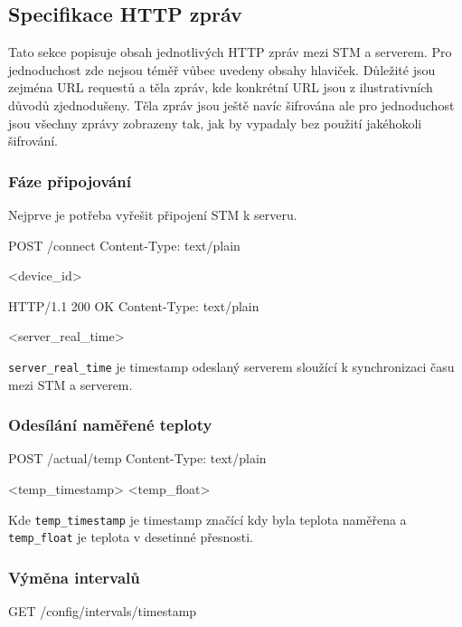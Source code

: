 \subsection{Specifikace HTTP zpráv} \label{kap:specifikace-http-zprav}

Tato sekce popisuje obsah jednotlivých HTTP zpráv mezi STM a serverem.
Pro jednoduchost zde nejsou téměř vůbec uvedeny obsahy hlaviček.
Důležité jsou zejména URL requestů a těla zpráv, kde konkrétní URL jsou z ilustrativních důvodů
zjednodušeny.
Těla zpráv jsou ještě navíc šifrována ale pro jednoduchost jsou všechny zprávy zobrazeny tak,
jak by vypadaly bez použití jakéhokoli šifrování.

\subsubsection{Fáze připojování}
Nejprve je potřeba vyřešit připojení STM k serveru.

\begin{packetstm}
POST /connect
Content-Type: text/plain

<device_id>
\end{packetstm}

\begin{packetserver}
HTTP/1.1 200 OK
Content-Type: text/plain

<server_real_time>
\end{packetserver}

\texttt{server\_real\_time} je timestamp odeslaný serverem sloužící k synchronizaci času
mezi STM a serverem.

\subsubsection{Odesílání naměřené teploty}
\begin{packetstm}
POST /actual/temp
Content-Type: text/plain

<temp_timestamp>
<temp_float>
\end{packetstm}

Kde \texttt{temp\_timestamp} je timestamp značící kdy byla teplota naměřena a \\
\texttt{temp\_float} je teplota v desetinné přesnosti.

\subsubsection{Výměna intervalů}
\begin{packetstm}
GET /config/intervals/timestamp
\end{packetstm}

